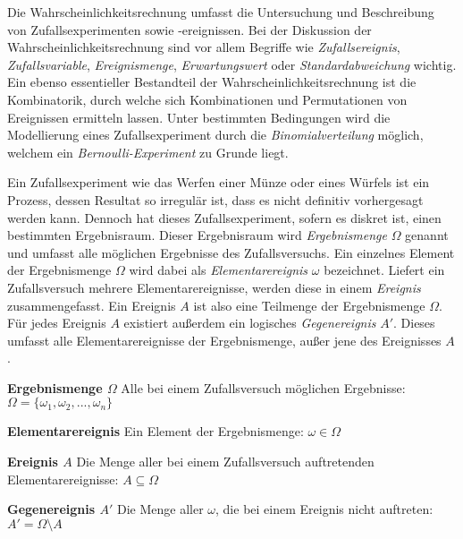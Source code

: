 



\thispagestyle{plain}


Die Wahrscheinlichkeitsrechnung umfasst die Untersuchung und Beschreibung von Zufallsexperimenten sowie -ereignissen. Bei der Diskussion der Wahrscheinlichkeitsrechnung sind vor allem Begriffe wie \emph{Zufallsereignis}, \emph{Zufallsvariable}, \emph{Ereignismenge}, \emph{Erwartungswert} oder \emph{Standardabweichung} wichtig. Ein ebenso essentieller Bestandteil der Wahrscheinlichkeitsrechnung ist die Kombinatorik, durch welche sich Kombinationen und Permutationen von Ereignissen ermitteln lassen. Unter bestimmten Bedingungen wird die Modellierung eines Zufallsexperiment durch die \emph{Binomialverteilung} m\"{o}glich, welchem ein \emph{Bernoulli-Experiment} zu Grunde liegt. 


Ein Zufallsexperiment wie das Werfen einer M\"{u}nze oder eines W\"{u}rfels ist ein Prozess, dessen Resultat so irregul\"{a}r ist, dass es nicht definitiv vorhergesagt werden kann. Dennoch hat dieses Zufallsexperiment, sofern es diskret ist, einen bestimmten Ergebnisraum. Dieser Ergebnisraum wird \emph{Ergebnismenge} $\Omega$ genannt und umfasst alle m\"{o}glichen Ergebnisse des Zufallsversuchs. Ein einzelnes Element der Ergebnismenge $\Omega$ wird dabei als \emph{Elementarereignis} $\omega$ bezeichnet. Liefert ein Zufallsversuch mehrere Elementarereignisse, werden diese in einem \emph{Ereignis} zusammengefasst. Ein Ereignis $A$ ist also eine Teilmenge der Ergebnismenge $\Omega$. F\"{u}r jedes Ereignis $A$ existiert au\ss{}erdem ein logisches \emph{Gegenereignis} $A'$. Dieses umfasst alle Elementarereignisse der Ergebnismenge, au\ss{}er jene des Ereignisses $A$. 

\textbf{Ergebnismenge $\Omega$}  Alle bei einem Zufallsversuch m\"{o}glichen Ergebnisse: $\Omega = \{ \omega_1, \omega_2, ..., \omega_n\}$

\textbf{Elementarereignis}  Ein Element der Ergebnismenge: $\omega \in \Omega$

\textbf{Ereignis $A$}  Die Menge aller bei einem Zufallsversuch auftretenden Elementarereignisse: $A \subseteq \Omega$

\textbf{Gegenereignis $A'$}  Die Menge aller $\omega$, die bei einem Ereignis nicht auftreten: $A' = \Omega \setminus A$

